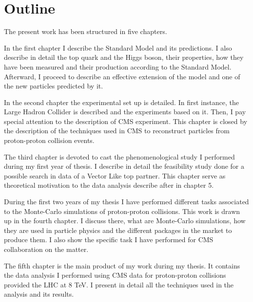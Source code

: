 \chapter*{Outline}

The present work has been structured in five chapters.

In the first chapter I describe the Standard Model and its predictions. I also describe in detail the top quark and the Higgs boson, their properties, how they have been measured and their production according to the Standard Model. Afterward, I proceed to describe an effective extension of the model and one of the new particles predicted by it. 

In the second chapter the experimental set up is detailed. In first instance, the Large Hadron Collider is described and the experiments based on it. Then, I pay special attention to the description of CMS experiment. This chapter is closed by the description of the techniques used in CMS to reconstruct particles from proton-proton collision events. 

The third chapter is devoted to cast the phenomenological study I performed during my first year of thesis. I describe in detail the feasibility study done for a possible search in data of a Vector Like top partner. This chapter serve as theoretical motivation to the data analysis describe after in chapter 5.

During the first two years of my thesis I have performed different tasks associated to the Monte-Carlo simulations of proton-proton collisions. This work is drawn up in the fourth chapter. I discuss there, what are Monte-Carlo simulations, how they are used in particle physics and the different packages in the market to produce them. I also show the specific task I have performed for CMS collaboration on the matter.

The fifth chapter is the main product of my work during my thesis. It contains the data analysis I performed using CMS data for proton-proton collisions provided the LHC at 8 TeV. I present in detail all the techniques used in the analysis and its results.